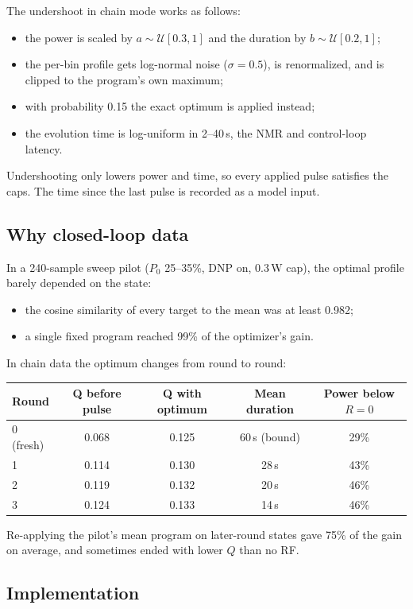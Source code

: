 \documentclass[11pt]{article}
\begin{document}
The undershoot in chain mode works as follows:
\begin{itemize}
\item the power is scaled by \(a\sim\mathcal U[0.3,1]\) and the duration by
\(b\sim\mathcal U[0.2,1]\);
\item the per-bin profile gets log-normal noise (\(\sigma=0.5\)), is renormalized, and is clipped
to the program's own maximum;
\item with probability 0.15 the exact optimum is applied instead;
\item the evolution time is log-uniform in 2--40\,s, the NMR and control-loop latency.
\end{itemize}
Undershooting only lowers power and time, so every applied pulse satisfies the caps. The time
since the last pulse is recorded as a model input.

\subsection{Why closed-loop data}

In a 240-sample sweep pilot (\(P_0\) 25--35\%, DNP on, 0.3\,W cap), the optimal profile barely
depended on the state:
\begin{itemize}
\item the cosine similarity of every target to the mean was at least 0.982;
\item a single fixed program reached 99\% of the optimizer's gain.
\end{itemize}
In chain data the optimum changes from round to round:

\begin{center}
\begin{tabular}{lcccc}
\toprule
Round & Q before pulse & Q with optimum & Mean duration & Power below \(R=0\)\\
\midrule
0 (fresh) & 0.068 & 0.125 & 60\,s (bound) & 29\%\\
1 & 0.114 & 0.130 & 28\,s & 43\%\\
2 & 0.119 & 0.132 & 20\,s & 46\%\\
3 & 0.124 & 0.133 & 14\,s & 46\%\\
\bottomrule
\end{tabular}
\end{center}

\noindent Re-applying the pilot's mean program on later-round states gave 75\% of the gain on
average, and sometimes ended with lower \(Q\) than no RF.

\subsection{Implementation}
\end{document}
